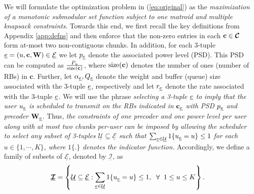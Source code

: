 \documentclass[11pt] {article}
\newcommand{\uwti}[1]{{\mathbf #1}}
\newcommand{\cb}{{\uwti c}}  \newcommand{\Cb}{{\uwti C}}
\newcommand{\Iulk} {{\underline{{\bm {\mathcal I}}}}}
\newcommand{\Uulc} {{\underline{\mathcal U}}}
\newcommand{\Eulc} {{\underline{\mathcal E}}}
\begin{document}
We will formulate the optimization problem in (\ref{eq:original}) as the {\em maximization of a monotonic submodular set function subject to one matroid and multiple knapsack   constraints}. Towards this end,  we first recall the key definitions from Appendix \ref{app:defns} and then
  enforce that   the non-zero entries in each $\cb\in\Ck$ form at-most two non-contiguous chunks.
In addition, for each 3-tuple $\eul=(u,\cb,\Wb)\in\Eulc$ we let $p_{{\underline e}}$ denote the associated power level (PSD).  This PSD can be computed as $\frac{P_{u}}{{\rm size(\cb)}}$, where ${\rm size(\cb)}$ denotes the number of ones (number of RBs) in $\cb$. Further, let  $\alpha_{{\underline e}},Q_{{\underline e}}$ denote the weight  and buffer (queue) size associated with the 3-tuple ${\underline e}$, respectively and let $r_{{\underline e}}$ denote the rate associated with the 3-tuple ${\underline e}$. We will use the phrase {\em selecting a 3-tuple ${\underline e}$ to imply that
the user $u_{{\underline e}}$ is scheduled to transmit on the RBs indicated in $\cb_{\eul}$ with PSD $p_{{\underline e}}$ and
 precoder $\Wb_{\eul}$}. Thus,  {\em the constraints of one precoder and one power level per user
 along with at most two chunks per-user can be imposed by allowing the scheduler to select any subset of 3-tuples $\Uulc\subseteq\Eulc$ such that $\sum_{\eul\in\Uulc}1\{u_{\eul}=u\}\leq 1$ for each $u\in\{1,\cdots,K\}$, where $1\{.\}$ denotes the indicator function.}
  Accordingly, we define   a family of subsets of $\Eulc$, denoted by $\Iulk$, as
  \begin{eqnarray}\label{eq:Indfamily}
 \Iulk=\left\{\Uulc\subseteq\Eulc: \sum_{\eul\in\Uulc}1\{u_{\eul}=u\}\leq 1,\;\;\forall\;\;1\leq u\leq K \right\}.
 \end{eqnarray}
\end{document}
